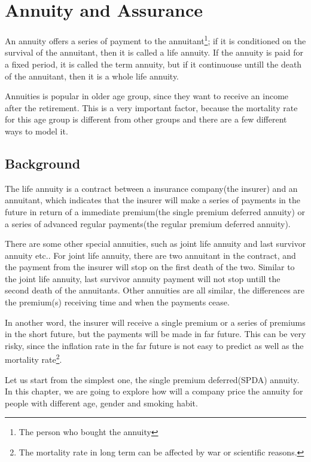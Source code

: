 \documentclass{report}
\begin{document}
\chapter{Annuity and Assurance}    \label{annuity}

An annuity offers a series of payment to the annuitant\footnote{The person who bought the annuity}; if it is conditioned on the survival of the annuitant, then it is called a life annuity. If the annuity is paid for a fixed period, it is called the term annuity, but if it continuouse untill the death of the annuitant, then it is a whole life annuity.


Annuities is popular in older age group, since they want to receive an income after the retirement. This is a very important factor, because the mortality rate for this age group is different from other groups and there are a few different ways to model it. 


\section{Background}

The life annuity is a contract between a insurance company(the insurer) and an annuitant\cite{bib:annuity-def}, which indicates that the insurer will make a series of payments in the future in return of a immediate premium(the single premium deferred annuity) or a series of advanced regular payments(the regular premium deferred annuity). 


There are some other special annuities, such as joint life annuity and last survivor annuity etc.. For joint life annuity, there are two annuitant in the contract, and the payment from the insurer will stop on the first death of the two. Similar to the joint life annuity, last survivor annuity payment will not stop untill the second death of the annuitants. Other annuities are all similar, the differences are the premium(s) receiving time and when the payments cease. 


In another word, the insurer will receive a single premium or a series of premiums in the short future, but the payments will be made in far future. This can be very risky, since the inflation rate in the far future is not easy to predict as well as the mortality rate\footnote{The mortality rate in long term can be affected by war or scientific reasons.}.

Let us start from the simplest one, the single premium deferred(SPDA) annuity. In this chapter, we are going to explore how will a company price the annuity for people with different age, gender and smoking habit.
\end{document}
